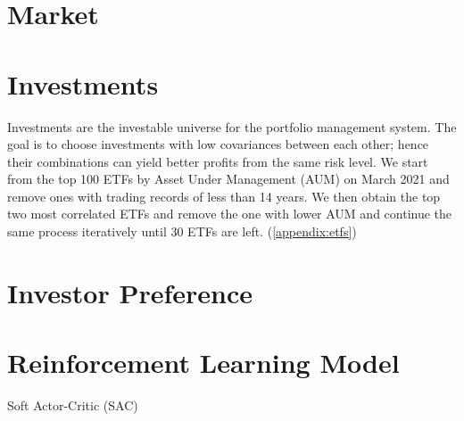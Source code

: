 \section{Market}
\section{Investments}
Investments are the investable universe for the portfolio management system. The goal is to choose investments with low covariances between each other; hence their combinations can yield better profits from the same risk level. We start from the top 100 ETFs by Asset Under Management (AUM) on March 2021 and remove ones with trading records of less than 14 years. We then obtain the top two most correlated ETFs and remove the one with lower AUM and continue the same process iteratively until 30 ETFs are left.  (\autoref{appendix:etfs})
\par


\section{Investor Preference}
\section{Reinforcement Learning Model}
Soft Actor-Critic (SAC)\cite{haarnoja2018soft}